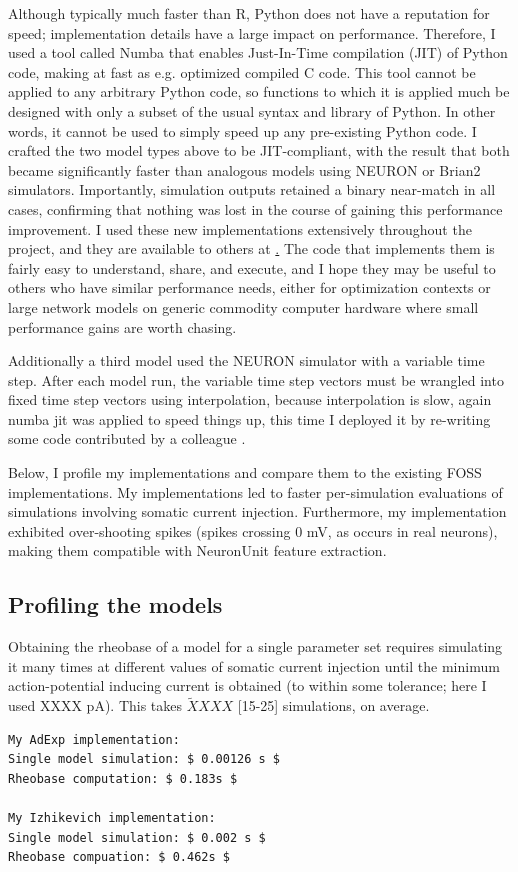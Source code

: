 Although typically much faster than R, Python does not have a reputation for speed; implementation details have a large impact on performance.
Therefore, I used a tool called Numba \cite{lam2015numba} that enables Just-In-Time compilation (JIT) of Python code, making at fast as e.g. optimized compiled C code.
This tool cannot be applied to any arbitrary Python code, so functions to which it is applied much be designed with only a subset of the usual syntax and library of Python.
In other words, it cannot be used to simply speed up any pre-existing Python code.
I crafted the two model types above to be JIT-compliant, with the result that both became significantly faster than analogous models using NEURON or Brian2 simulators.
Importantly, simulation outputs retained a binary near-match in all cases, confirming that nothing was lost in the course of gaining this performance improvement.
I used these new implementations extensively throughout the project, and they are available to others at \href{https://github.com/russelljjarvis/jit_hub.git}. The code that implements them is fairly easy to understand, share, and execute, and I hope they may be useful to others who have similar performance needs, either for optimization contexts or large network models on generic commodity computer hardware where small performance gains are worth chasing. 

Additionally a third model used the NEURON simulator with a variable time step. After each model run, the variable time step vectors must be wrangled into fixed time step vectors using interpolation, because interpolation is slow, again numba jit was applied to speed things up, this time I deployed it by re-writing some code contributed by a colleague \cite{birgiolas2019towards}.

Below, I profile my implementations and compare them to the existing FOSS implementations.
My implementations led to faster per-simulation evaluations of simulations involving somatic current injection. 
Furthermore, my implementation exhibited over-shooting spikes (spikes crossing 0 mV, as occurs in real neurons), making them compatible with NeuronUnit feature extraction.

\subsection{Profiling the models}
Obtaining the rheobase of a model for a single parameter set requires simulating it many times at different values of somatic current injection until the minimum action-potential inducing current is obtained (to within some tolerance; here I used XXXX pA).
This takes $\tilde XXXX$ [15-25] simulations, on average.
\begin{verbatim}
My AdExp implementation:
Single model simulation: $ 0.00126 s $
Rheobase computation: $ 0.183s $

My Izhikevich implementation:
Single model simulation: $ 0.002 s $
Rheobase compuation: $ 0.462s $ 
\end{verbatim}



